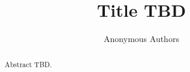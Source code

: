 \documentclass{article}
\title{Title TBD}
\author{Anonymous Authors}
\begin{document}
\maketitle

\begin{abstract}
Abstract TBD.
\end{abstract}












\end{document}
